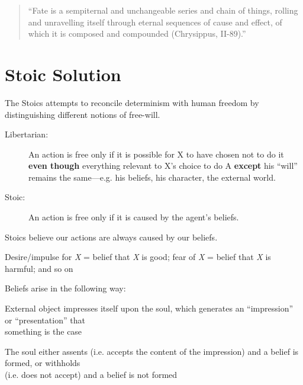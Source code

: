 \documentclass[11pt]{article}
\begin{document}
\begin{quote}
``Fate is a sempiternal and unchangeable series and chain of things, rolling and unravelling itself through eternal sequences of cause and effect, of which it is composed and compounded (Chrysippus, II-89).''
\end{quote}





\section*{Stoic Solution}
\noindent The Stoics attempts to reconcile determinism with human freedom by distinguishing different notions of free-will. 
\begin{description}
\item[Libertarian:] An action is free only if it is possible for X to have chosen not to do it \textbf{even though} everything relevant to X's choice to do A \textbf{except} his ``will'' remains the same---e.g. his beliefs, his character, the external world.
\item[Stoic:] An action is free only if it is caused by the agent's beliefs.
\end{description}
\vspace*{2mm}



\noindent Stoics believe our actions are always caused by our beliefs.
\vspace*{2mm}

\noindent Desire/impulse for \emph{X} = belief that \emph{X} is good; fear of \emph{X} = belief that \emph{X} is harmful; and so on
\vspace*{2mm}

\noindent Beliefs arise in the following way: 
\vspace*{2mm}

External object impresses itself upon the soul, which generates an ``impression'' or ``presentation'' that\\\hspace*{6mm}something is the case
\vspace*{1mm}

The soul either assents (i.e. accepts the content of the impression) and a belief is formed, or withholds\\\hspace*{6mm}(i.e. does not accept) and a belief is not formed
\vspace*{2mm}
\end{document}
